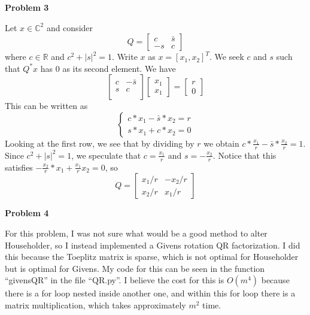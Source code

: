 \documentclass{article}
\def\R{\mathbb{R}}
\def\C{\mathbb{C}}
\newcommand{\Problem}[1]{\textbf{Problem #1}}
\begin{document}
\Problem{3}

Let $x \in \C^2$ and consider 
\begin{equation*}
Q = \begin{bmatrix}
 	c & \bar{s}\\
 	-s & c
\end{bmatrix}	
\end{equation*}
where $c \in \R$ and $c^2 + 	|s|^2 = 1$. 
Write $x$ as $x = [x_1,x_2]^T$. 
We seek $c$ and $s$ such that $Q^*x$ has 0 as its second element.
We have 
\begin{equation*}
\begin{bmatrix}
c & -\bar{s} \\
s & c\\	
\end{bmatrix}
\begin{bmatrix}
x_1\\
x_1	
\end{bmatrix}
=
\begin{bmatrix}
r\\
0	
\end{bmatrix}
\end{equation*}
This can be written as
\begin{equation*}
\begin{cases}
	c*x_1 - \bar{s}*x_2 = r\\
	s*x_1 + c*x_2 = 0
\end{cases}	
\end{equation*}
Looking at the first row, we see that by dividing by $r$ we obtain $c * \frac{x_1}{r} - \bar{s} * \frac{x_2}{r} = 1$. 
Since $c^2 + |s|^2 = 1$, we speculate that $c = \frac{x_1}{r}$ and $s = -\frac{x_2}{r}$. 
Notice that this satisfies $-\frac{x_2}{r}*x_1 + \frac{x_1}{r} x_2 = 0$, so 
\begin{equation*}
Q = \begin{bmatrix}
 	x_1/r & -x_2/r\\
 	x_2/r & x_1/r
\end{bmatrix}	
\end{equation*}

\Problem{4}

For this problem, I was not sure what would be a good method to alter Householder, so I instead implemented a Givens rotation QR factorization.
I did this because the Toeplitz matrix is sparse, which is not optimal for Householder but is optimal for Givens. 
My code for this can be seen in the function ``givensQR'' in the file ``QR.py''. 
I believe the cost for this is $O(m^4)$ because there is a for loop nested inside another one, and within this for loop there is a matrix multiplication, which takes approximately $m^2$ time. 
\end{document}
